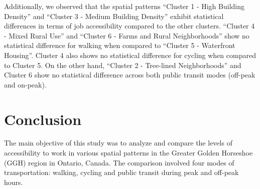 \documentclass[conference,final,]{IEEEtran}
\begin{document}
\begin{table}[!ht]
\centering
\caption{COMPARISIONS OF JOB ACCESSIBILITY BETWEEN SPATIAL PATTERNS.}
\label{tab:tests_access}
\end{table}

Additionally, we observed that the spatial patterns ``Cluster 1 - High
Building Density'' and ``Cluster 3 - Medium Building Density'' exhibit
statistical differences in terms of job accessibility compared to the
other clusters. ``Cluster 4 - Mixed Rural Use'' and ``Cluster 6 - Farms
and Rural Neighborhoods'' show no statistical difference for walking
when compared to ``Cluster 5 - Waterfront Housing''. Cluster 4 also
shows no statistical difference for cycling when compared to Cluster 5.
On the other hand, ``Cluster 2 - Tree-lined Neighborhoods'' and Cluster
6 show no statistical difference across both public transit modes
(off-peak and on-peak).

\hypertarget{conclusion}{%
\section{Conclusion}\label{conclusion}}

The main objective of this study was to analyze and compare the levels
of accessibility to work in various spatial patterns in the Greater
Golden Horseshoe (GGH) region in Ontario, Canada. The comparison
involved four modes of transportation: walking, cycling and public
transit during peak and off-peak hours.
\end{document}
